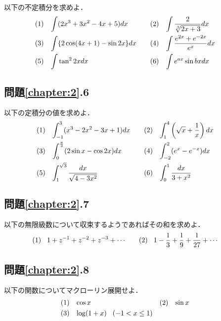 以下の不定積分を求めよ．
\begin{align}
(1) \hspace{3mm} & \displaystyle \int (2x^3+3x^2-4x+5) dx \nonumber &  & &
(2) \hspace{3mm} & \int \displaystyle \frac{2}{\sqrt[3]{2x+3}} dx & \nonumber \\
(3) \hspace{3mm} & \int \{ 2\cos (4x+1) -\sin 2x \} dx \nonumber & & &
(4) \hspace{3mm} & \int \displaystyle \frac{e^{2x}+e^{-2x}}{e^x} dx & \nonumber \\
(5) \hspace{3mm} & \int \displaystyle \tan^2 2x dx & \nonumber & &
(6) \hspace{3mm} & \int \displaystyle e^{ax} \sin bx dx & \nonumber
\end{align}




\subsection*{問題\ref{chapter:2}.6}

以下の定積分の値を求めよ．
\begin{align}
(1) \hspace{3mm} & \displaystyle \int_{-1}^{3} (x^3-2x^2-3x+1) dx \nonumber &  & &
(2) \hspace{3mm} & \int_{1}^{4} \displaystyle \left ( \sqrt{x}+\frac{1}{x} \right ) dx & \nonumber \\
(3) \hspace{3mm} & \int_{0}^{\frac{\pi}{3}} ( 2\sin x -\cos 2x ) dx & & &
(4) \hspace{3mm} & \int_{-2}^{2} \displaystyle (e^x - e^{-x}) dx & \nonumber \\
(5) \hspace{3mm} & \int_{1}^{\sqrt{3}} \displaystyle \frac{dx}{\sqrt{4-3x^2}} & \nonumber & &
(6) \hspace{3mm} & \int_{0}^{1} \displaystyle \frac{dx}{3+x^2} & \nonumber
\end{align}


\subsection*{問題\ref{chapter:2}.7}

以下の無限級数について収束するようであればその和を求めよ．
\begin{align}
(1) \hspace{3mm} & 1+z^{-1}+z^{-2}+z^{-3}+\cdots & \nonumber  &  & 
(2) \hspace{3mm} & \displaystyle 1-\frac{1}{3}+\frac{1}{9}+\frac{1}{27}+\cdots & \nonumber 
\end{align}

\subsection*{問題\ref{chapter:2}.8}

以下の関数についてマクローリン展開せよ．
\begin{align}
(1) \hspace{3mm} & \cos x    \nonumber  &  
(2) \hspace{3mm} & \sin x   \nonumber &\\
(3) \hspace{3mm} & \log (1+x) \hspace{3mm}  (-1 < x \leq 1) &  & \nonumber 
\end{align}

